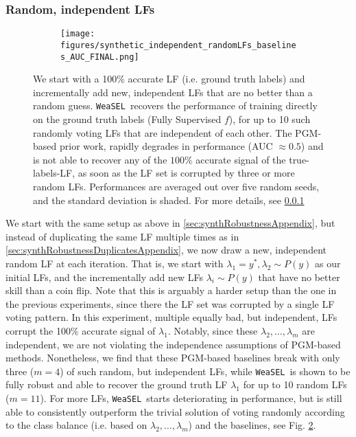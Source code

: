 \documentclass{article}
\newcommand{\weasel}{\texttt{WeaSEL}}\newcommand{\brackets}[1]{\left( #1 \right)}
\begin{document}
\subsubsection{Random, independent LFs}
\label{sec:synthRobustnessIndependentAppendix}
\begin{figure}
    \begin{subfigure}{.95\textwidth}
      \centering
      \texttt{[image: figures/synthetic\_independent\_randomLFs\_baselines\_AUC\_FINAL.png]}
      \label{fig:synthRobustnessIndepRandomLFsAUC}
    \end{subfigure}\caption{We start with a 100\% accurate LF (i.e. ground truth labels) and incrementally add new, independent LFs that are no better than a random guess.
  \weasel\ recovers the performance of training directly on the ground truth labels (Fully Supervised $f$), for up to 10 such randomly voting LFs that are independent of each other.
  The PGM-based prior work, rapidly degrades in performance (AUC $\approx0.5$) and is not able to recover any of the $100$\% accurate signal of the true-labels-LF, as soon as the LF set is corrupted by three or more random LFs.
  Performances are averaged out over five random seeds, and the standard deviation is shaded. For more details, see \ref{sec:synthRobustnessIndependentAppendix}}
  \label{fig:synthRobustnessIndepRandomLFs}
\end{figure} We start with the same setup as above in \ref{sec:synthRobustnessAppendix}, but instead of duplicating the same LF multiple times as in \ref{sec:synthRobustnessDuplicatesAppendix}, we now draw a new, independent random LF at each iteration.
That is, we start with  $\lambda_1 = y^*, \lambda_2 \sim P(y)$ as our initial LFs, and the incrementally add new LFs $\lambda_i \sim P(y)$ that have no better skill than a coin flip.
Note that this is arguably a harder setup than the one in the previous experiments, since there the LF set was corrupted by a single LF voting pattern. In this experiment, multiple equally bad, but independent, LFs corrupt the 100\% accurate signal of $\lambda_1$. Notably, since these $\lambda_2, \dots, \lambda_m$ are independent, we are not violating the independence assumptions of PGM-based methods.
Nonetheless, we find that these PGM-based baselines break with only three ($m=4$) of such random, but independent LFs, while \weasel\
is shown to be fully robust and able to recover the ground truth LF $\lambda_1$ for up to 10 random LFs ($m=11$). For more LFs, \weasel\ starts deteriorating in performance, but is still able to consistently outperform the trivial solution of voting randomly according to the class balance (i.e. based on $\lambda_2, \dots, \lambda_m$) and the baselines, see Fig. \ref{fig:synthRobustnessIndepRandomLFs}.
\end{document}
